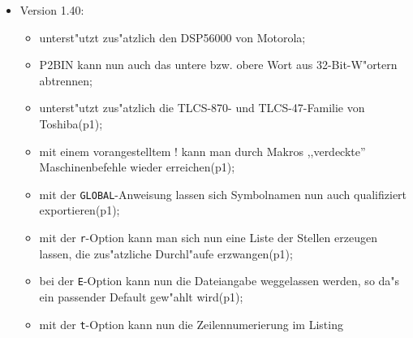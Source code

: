 \documentclass[12pt,a4paper,twoside]{report}
\newcommand{\tty}[1]{{\tt #1}}
\begin{document}
{\begin{itemize}
{\begin{itemize}
{            umleiten zu k"onnen (p3);}
      \item{Die Unklarheiten im 78(C)1x-Teil sind beseitigt (p4);}
      \item{neben dem MELPS-7700 ist nun auch das ,,Vorbild'' 65816
            vorhanden (p4);}
      \item{Die ST6-Pseudoanweisung \tty{ROMWIN} wurde entfernt und
            mit in den \tty{ASSUME}-Befehl eingegliedert (p4);}
      \item{unterst"utzt zus"atzlich den 6804 von SGS-Thomson (p4);}
      \item{durch die \tty{NOEXPORT}-Option in der Makrodefinition
            kann nun f"ur jedes Makro einzeln festgelegt werden, ob es
            in der MAC-Datei erscheinen soll oder nicht (p4);}
      \item{Die Bedeutung von \tty{MACEXP} f"ur Expansionen von Makros hat
            sich wegen der zus"atzlichen \tty{NOEXPAND}-Option in der
            Makrodefinition leicht ge"andert (p4);}
      \item{Durch die \tty{GLOBAL}-Option in der Makrodefinition k"onnen nun
            zus"atzlich Makros definiert werden, die durch ihren
            Sektionsnamen eindeutig gekennzeichnet sind (p4).}
      \end{itemize}}
\item{Version 1.40:
      \begin{itemize}
      \item{unterst"utzt zus"atzlich den DSP56000 von Motorola;}
      \item{P2BIN kann nun auch das untere bzw. obere Wort aus
            32-Bit-W"ortern abtrennen;}
      \item{unterst"utzt zus"atzlich die TLCS-870- und TLCS-47-Familie
            von Toshiba(p1);}
      \item{mit einem vorangestelltem ! kann man durch Makros
            ,,verdeckte'' Maschinenbefehle wieder erreichen(p1);}
      \item{mit der \tty{GLOBAL}-Anweisung lassen sich Symbolnamen
            nun auch qualifiziert exportieren(p1);}
      \item{mit der \tty{r}-Option kann man sich nun eine Liste der
            Stellen erzeugen lassen, die zus"atzliche Durchl"aufe
            erzwangen(p1);}
      \item{bei der \tty{E}-Option kann nun die Dateiangabe weggelassen werden,
            so da"s ein passender Default gew"ahlt wird(p1);}
      \item{mit der \tty{t}-Option kann nun die Zeilennumerierung im Listing
}
\end{itemize}}
\end{itemize}}
\end{document}
